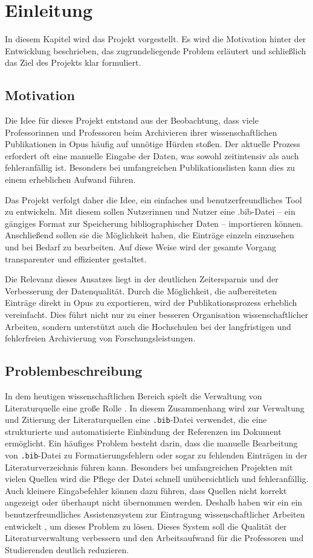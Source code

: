 \chapter{Einleitung}
In diesem Kapitel wird das Projekt vorgestellt. Es wird die Motivation 
hinter der Entwicklung beschrieben, das zugrundeliegende Problem erläutert
und schließlich das Ziel des Projekts klar formuliert. 

\section{Motivation}
Die Idee für dieses Projekt entstand aus der Beobachtung, dass viele 
Professorinnen und Professoren beim Archivieren ihrer wissenschaftlichen 
Publikationen in Opus häufig auf unnötige Hürden stoßen. Der aktuelle Prozess 
erfordert oft eine manuelle Eingabe der Daten, was sowohl zeitintensiv 
als auch fehleranfällig ist. Besonders bei umfangreichen Publikationslisten 
kann dies zu einem erheblichen Aufwand führen.

Das Projekt verfolgt daher die Idee, ein einfaches und 
benutzerfreundliches Tool zu entwickeln. Mit diesem sollen Nutzerinnen und 
Nutzer eine .bib-Datei – ein gängiges Format zur Speicherung 
bibliographischer Daten – importieren können. Anschließend sollen sie die 
Möglichkeit haben, die Einträge einzeln einzusehen und bei Bedarf zu 
bearbeiten. Auf diese Weise wird der gesamte Vorgang transparenter und 
effizienter gestaltet.

Die Relevanz dieses Ansatzes liegt in der deutlichen Zeitersparnis und der 
Verbesserung der Datenqualität. Durch die Möglichkeit, die aufbereiteten 
Einträge direkt in Opus zu exportieren, wird der Publikationsprozess 
erheblich vereinfacht. Dies führt nicht nur zu einer besseren Organisation 
wissenschaftlicher Arbeiten, sondern unterstützt auch die Hochschulen bei 
der langfristigen und fehlerfreien Archivierung von Forschungsleistungen.

\section{Problembeschreibung}
In dem  heutigen wissenschaftlichen Bereich spielt die Verwaltung von Literaturquelle eine große Rolle .
In diesem Zusammenhang wird zur Verwaltung und Zitierung der Literaturquellen eine \texttt{.bib}-Datei verwendet,
 die eine strukturierte und automatisierte Einbindung der Referenzen im Dokument ermöglicht.
Ein häufiges Problem besteht darin, dass die manuelle Bearbeitung von \texttt{.bib}-Datei zu 
 Formatierungsfehlern oder sogar zu fehlenden Einträgen in der Literaturverzeichnis führen kann.
Besonders bei umfangreichen Projekten mit vielen Quellen wird die Pflege der Datei schnell unübersichtlich und fehleranfällig.
Auch kleinere Eingabefehler können dazu führen, dass Quellen nicht korrekt angezeigt oder überhaupt nicht übernommen werden.
Deshalb haben wir ein ein benutzerfreundliches Assistenzsystem zur Eintragung wissenschaftlicher Arbeiten entwickelt ,
 um dieses Problem zu lösen.
 Dieses System soll die Qualität der Literaturverwaltung verbessern und den Arbeitsaufwand für die Professoren und 
 Studierenden deutlich reduzieren.



